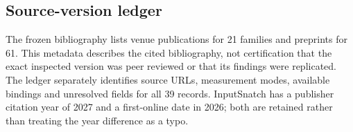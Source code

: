 \subsection{Source-version ledger}

The frozen bibliography lists venue publications for 21 families and preprints for 61. This metadata describes the cited bibliography, not certification that the exact inspected version was peer reviewed or that its findings were replicated. The ledger separately identifies source URLs, measurement modes, available bindings and unresolved fields for all 39 records. InputSnatch has a publisher citation year of 2027 and a first-online date in 2026; both are retained rather than treating the year difference as a typo.

